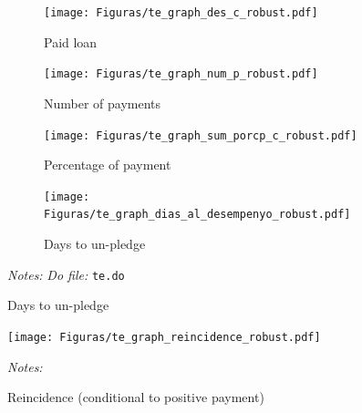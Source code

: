 \documentclass[11pt]{article}
\begin{document}
\begin{figure}[H]
    \caption{Treatment Effect (conditional to positive payment)}
    \label{Treatment Effect}
    \begin{center}
    \begin{subfigure}{0.4\textwidth}
        \caption{Paid loan}
        \centering
        \texttt{[image: Figuras/te\_graph\_des\_c\_robust.pdf]}
    \end{subfigure}
    \begin{subfigure}{0.4\textwidth}
        \caption{Number of payments}
        \centering
        \texttt{[image: Figuras/te\_graph\_num\_p\_robust.pdf]}
    \end{subfigure}
     \begin{subfigure}{0.4\textwidth}
      \caption{Percentage of payment}
        \centering
        \texttt{[image: Figuras/te\_graph\_sum\_porcp\_c\_robust.pdf]}
    \end{subfigure}
      \begin{subfigure}{0.4\textwidth}
      \caption{Days to un-pledge}
        \centering
        \texttt{[image: Figuras/te\_graph\_dias\_al\_desempenyo\_robust.pdf]}
    \end{subfigure}
    \end{center}
     \footnotesize \textit{Notes: } 
      \footnotesize{ \textit{Do file: }  \texttt{te.do}}
\end{figure}

\begin{figure}[H]
        \caption{Reincidence (conditional to positive payment)}
    \label{micas}
    \begin{center}
        \centering
        \texttt{[image: Figuras/te\_graph\_reincidence\_robust.pdf]}
    \end{center}
     \footnotesize \textit{Notes: } 
      \footnotesize{ }
\end{figure}
\end{document}
